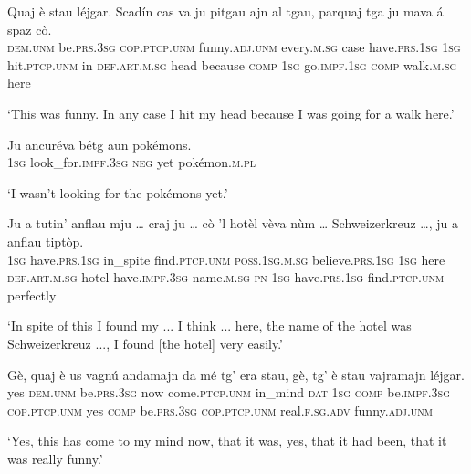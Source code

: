 \begin{linenumbers}
	\gll Quaj è stau léjgar. Scadín cas va ju pitgau ajn al tgau, parquaj tga ju mava á spaz cò.   \\
	\textsc{dem.unm} be.\textsc{prs.3sg} \textsc{cop.ptcp.unm} funny.\textsc{adj.unm} every.\textsc{m.sg} case have.\textsc{prs.1sg} \textsc{1sg} hit.\textsc{ptcp.unm} in \textsc{def.art.m.sg} head because \textsc{comp} \textsc{1sg} go.\textsc{impf.1sg} \textsc{comp} walk.\textsc{m.sg} here \\
\end{linenumbers}
\medskip
\glt `This was funny. In any case I hit my head because I was going for a walk here.'
\medskip

\begin{linenumbers}
	\gll  Ju ancuréva bétg aun pokémons.\\
	\textsc{1sg} look\_for.\textsc{impf.3sg} \textsc{neg} yet pokémon.\textsc{m.pl}\\
\end{linenumbers}
\medskip
\glt `I wasn't looking for the pokémons yet.'
\medskip

\begin{linenumbers}
	\gll Ju a tutin’ anflau mju … craj ju … cò ’l hotèl vèva nùm … Schweizerkreuz …, ju a anflau tiptòp.   \\
 	\textsc{1sg} have.\textsc{prs.1sg} in\_spite find.\textsc{ptcp.unm} \textsc{poss.1sg.m.sg} {} believe.\textsc{prs.1sg} \textsc{1sg} {} here \textsc{def.art.m.sg} hotel have.\textsc{impf.3sg} name.\textsc{m.sg} {} \textsc{pn} {} \textsc{1sg} have.\textsc{prs.1sg} find.\textsc{ptcp.unm} perfectly\\
\end{linenumbers}
\medskip
\glt `In spite of this I found my ... I think ... here, the name of the hotel was Schweizerkreuz ..., I found [the hotel] very easily.'
\medskip

\begin{linenumbers}
	\gll Gè, quaj è us vagnú andamajn da mé tg’ era stau, gè, tg’ è stau vajramajn léjgar.   \\
	yes \textsc{dem.unm} be.\textsc{prs.3sg} now come.\textsc{ptcp.unm} in\_mind \textsc{dat} \textsc{1sg} \textsc{comp} be.\textsc{impf.3sg} \textsc{cop.ptcp.unm} yes \textsc{comp} be.\textsc{prs.3sg} \textsc{cop.ptcp.unm} real.\textsc{f.sg.adv} funny.\textsc{adj.unm} \\
\end{linenumbers}
\medskip
\glt `Yes, this has come to my mind now, that it was, yes, that it had been, that it was really funny.'
\bigskip

